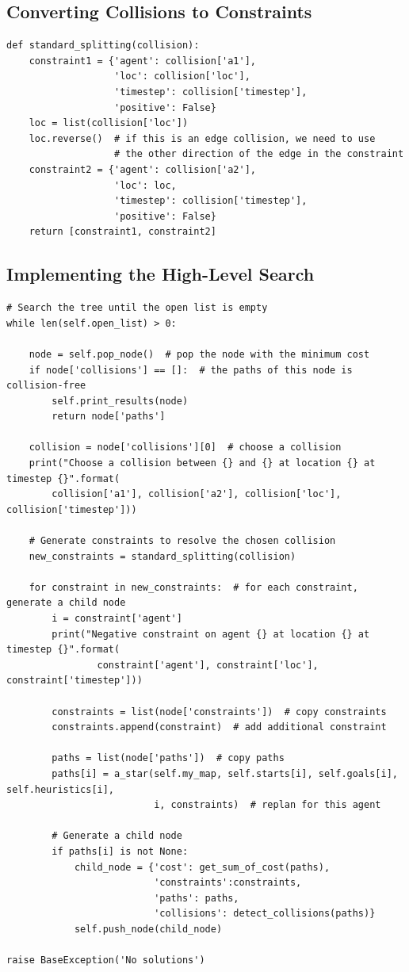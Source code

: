 \documentclass[11pt]{article}
\begin{document}
\subsection{Converting Collisions to Constraints}

\begin{verbatim}
def standard_splitting(collision):
    constraint1 = {'agent': collision['a1'],
                   'loc': collision['loc'],
                   'timestep': collision['timestep'],
                   'positive': False}
    loc = list(collision['loc'])
    loc.reverse()  # if this is an edge collision, we need to use
                   # the other direction of the edge in the constraint
    constraint2 = {'agent': collision['a2'],
                   'loc': loc,
                   'timestep': collision['timestep'],
                   'positive': False}
    return [constraint1, constraint2]
\end{verbatim}

\subsection{Implementing the High-Level Search}

\begin{verbatim}
# Search the tree until the open list is empty
while len(self.open_list) > 0:

    node = self.pop_node()  # pop the node with the minimum cost
    if node['collisions'] == []:  # the paths of this node is collision-free
        self.print_results(node)
        return node['paths']

    collision = node['collisions'][0]  # choose a collision
    print("Choose a collision between {} and {} at location {} at timestep {}".format(
        collision['a1'], collision['a2'], collision['loc'], collision['timestep']))

    # Generate constraints to resolve the chosen collision
    new_constraints = standard_splitting(collision)

    for constraint in new_constraints:  # for each constraint, generate a child node
        i = constraint['agent']
        print("Negative constraint on agent {} at location {} at timestep {}".format(
                constraint['agent'], constraint['loc'], constraint['timestep']))

        constraints = list(node['constraints'])  # copy constraints
        constraints.append(constraint)  # add additional constraint

        paths = list(node['paths'])  # copy paths
        paths[i] = a_star(self.my_map, self.starts[i], self.goals[i], self.heuristics[i],
                          i, constraints)  # replan for this agent

        # Generate a child node
        if paths[i] is not None:
            child_node = {'cost': get_sum_of_cost(paths),
                          'constraints':constraints,
                          'paths': paths,
                          'collisions': detect_collisions(paths)}
            self.push_node(child_node)
            
raise BaseException('No solutions')
\end{verbatim}
\end{document}
